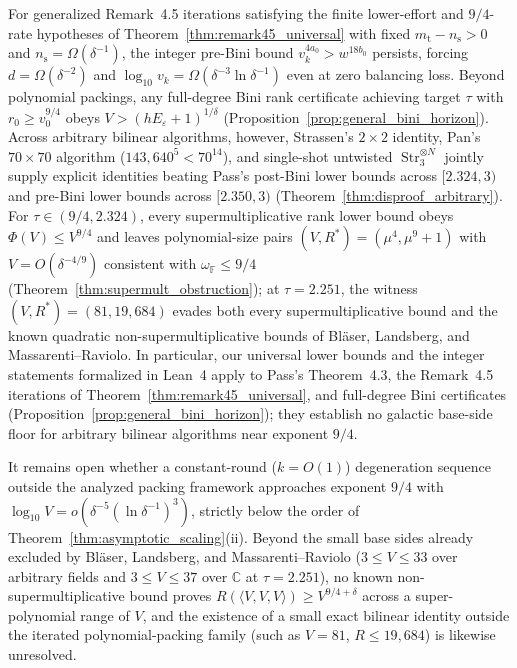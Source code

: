 \documentclass[11pt,a4paper]{article}
\theoremstyle{plain}
\theoremstyle{definition}
\theoremstyle{remark}
\newcommand{\C}{\mathbb{C}}
\newcommand{\F}{\mathbb{F}}
\DeclareMathOperator{\Str}{Str}
\begin{document}
For generalized Remark~4.5 iterations satisfying the finite lower-effort and $9/4$-rate hypotheses of Theorem~\ref{thm:remark45_universal} with fixed $m_{\mathrm{t}} - n_{\mathrm{s}} > 0$ and $n_{\mathrm{s}} = \Omega(\delta^{-1})$, the integer pre-Bini bound $v_k^{4 a_0} > w^{18 b_0}$ persists, forcing $d = \Omega(\delta^{-2})$ and $\log_{10} v_k = \Omega(\delta^{-3}\ln\delta^{-1})$ even at zero balancing loss. Beyond polynomial packings, any full-degree Bini rank certificate achieving target $\tau$ with $r_0 \ge v_0^{9/4}$ obeys $V > (h E_\varepsilon + 1)^{1/\delta}$ (Proposition~\ref{prop:general_bini_horizon}). Across arbitrary bilinear algorithms, however, Strassen's $2 \times 2$ identity, Pan's $70 \times 70$ algorithm ($143{,}640^5 < 70^{14}$), and single-shot untwisted $\Str_3^{\otimes N}$ jointly supply explicit identities beating Pass's post-Bini lower bounds across $[2.324, 3)$ and pre-Bini lower bounds across $[2.350, 3)$ (Theorem~\ref{thm:disproof_arbitrary}). For $\tau \in (9/4, 2.324)$, every supermultiplicative rank lower bound obeys $\Phi(V) \le V^{9/4}$ and leaves polynomial-size pairs $(V, R^*) = (\mu^4, \mu^9 + 1)$ with $V = O(\delta^{-4/9})$ consistent with $\omega_{\F} \le 9/4$ (Theorem~\ref{thm:supermult_obstruction}); at $\tau = 2.251$, the witness $(V, R^*) = (81, 19{,}684)$ evades both every supermultiplicative bound and the known quadratic non-supermultiplicative bounds of Bl\"aser, Landsberg, and Massarenti--Raviolo. In particular, our universal lower bounds and the integer statements formalized in Lean~4 apply to Pass's Theorem~4.3, the Remark~4.5 iterations of Theorem~\ref{thm:remark45_universal}, and full-degree Bini certificates (Proposition~\ref{prop:general_bini_horizon}); they establish no galactic base-side floor for arbitrary bilinear algorithms near exponent $9/4$.

It remains open whether a constant-round ($k = O(1)$) degeneration sequence outside the analyzed packing framework approaches exponent $9/4$ with $\log_{10} V = o(\delta^{-5}(\ln\delta^{-1})^3)$, strictly below the order of Theorem~\ref{thm:asymptotic_scaling}(ii). Beyond the small base sides already excluded by Bl\"aser, Landsberg, and Massarenti--Raviolo ($3 \le V \le 33$ over arbitrary fields and $3 \le V \le 37$ over $\C$ at $\tau = 2.251$), no known non-supermultiplicative bound proves $R(\langle V, V, V\rangle) \ge V^{9/4+\delta}$ across a super-polynomial range of $V$, and the existence of a small exact bilinear identity outside the iterated polynomial-packing family (such as $V = 81$, $R \le 19{,}684$) is likewise unresolved.
\end{document}
